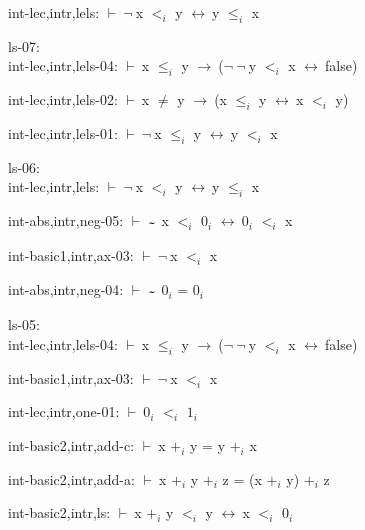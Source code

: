 \documentclass[a4paper]{article}
\newcommand{\tildesym}{\raisebox{-4pt}{\bf\~{}}}
\newcommand{\Fol}{\mbox{$\vdash\ $}}
\newcommand{\Not}{\mbox{$\neg\ $}}
\newcommand{\Imp}{\mbox{$\rightarrow\ $}}
\newcommand{\Equiv}{\mbox{$\leftrightarrow\ $}}
\begin{document}
int-lec,intr,lels: 
 \Fol \Not x $\mbox{$<$}_{i}$ y \Equiv y $\mbox{$\le$}_{i}$ x



\bigskip

ls-07:\\ int-lec,intr,lels-04: 
 \Fol x $\mbox{$\le$}_{i}$ y \Imp (\Not \Not y $\mbox{$<$}_{i}$ x \Equiv false)



int-lec,intr,lels-02: 
 \Fol x $\neq$ y \Imp (x $\mbox{$\le$}_{i}$ y \Equiv x $\mbox{$<$}_{i}$ y)



int-lec,intr,lels-01: 
 \Fol \Not x $\mbox{$\le$}_{i}$ y \Equiv y $\mbox{$<$}_{i}$ x



\bigskip

ls-06:\\ int-lec,intr,lels: 
 \Fol \Not x $\mbox{$<$}_{i}$ y \Equiv y $\mbox{$\le$}_{i}$ x



int-abs,intr,neg-05: 
 \Fol $\tildesym$ x $\mbox{$<$}_{i}$ $\mbox{0}_{i}$ \Equiv $\mbox{0}_{i}$ $\mbox{$<$}_{i}$ x



int-basic1,intr,ax-03: 
 \Fol \Not x $\mbox{$<$}_{i}$ x



int-abs,intr,neg-04: 
 \Fol $\tildesym$ $\mbox{0}_{i}$ = $\mbox{0}_{i}$



\bigskip

ls-05:\\ int-lec,intr,lels-04: 
 \Fol x $\mbox{$\le$}_{i}$ y \Imp (\Not \Not y $\mbox{$<$}_{i}$ x \Equiv false)



int-basic1,intr,ax-03: 
 \Fol \Not x $\mbox{$<$}_{i}$ x



int-lec,intr,one-01: 
 \Fol $\mbox{0}_{i}$ $\mbox{$<$}_{i}$ $\mbox{1}_{i}$



int-basic2,intr,add-c: 
 \Fol x $\mbox{+}_{i}$ y = y $\mbox{+}_{i}$ x



int-basic2,intr,add-a: 
 \Fol x $\mbox{+}_{i}$ y $\mbox{+}_{i}$ z = (x $\mbox{+}_{i}$ y) $\mbox{+}_{i}$ z



int-basic2,intr,ls: 
 \Fol x $\mbox{+}_{i}$ y $\mbox{$<$}_{i}$ y \Equiv x $\mbox{$<$}_{i}$ $\mbox{0}_{i}$
\end{document}
